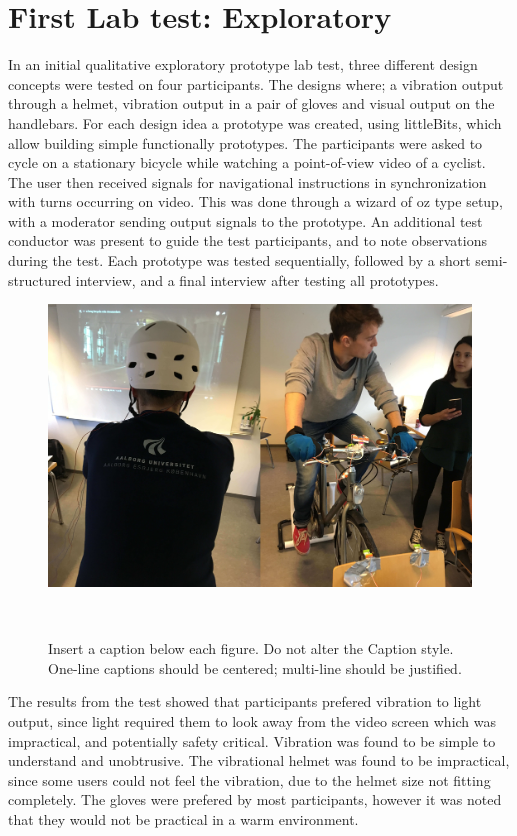 \documentclass{sigchi}
\begin{document}
\section{First Lab test: Exploratory}
In an initial qualitative exploratory prototype lab test, three different design concepts were tested on four participants. The designs where; a vibration output through a helmet, vibration output in a pair of gloves and visual output on the handlebars. 
For each design idea a prototype was created, using littleBits, which allow building simple functionally prototypes. The participants were asked to cycle on a stationary bicycle while watching a point-of-view video of a cyclist. The user then received signals for navigational instructions in synchronization with turns occurring on video. This was done through a wizard of oz type setup, with a moderator sending output signals to the prototype. An additional test conductor was present to guide the test participants, and to note observations during the test. Each prototype was tested sequentially, followed by a short semi-structured interview, and a final interview after testing all prototypes.
\begin{figure}
\centering
  \includegraphics[width=0.9\columnwidth]{figures/eval1_setup.jpg}
  \caption{Insert a caption below each figure. Do not alter the
    Caption style.  One-line captions should be centered; multi-line
    should be justified. }~\label{fig:figure1}
\end{figure}
The results from the test showed that participants prefered vibration to light output, since light required them to look away from the video screen which was impractical, and potentially safety critical. Vibration was found to be simple to understand and unobtrusive. The vibrational helmet was found to be impractical, since some users could not feel the vibration, due to the helmet size not fitting completely. The gloves were prefered by most participants, however it was noted that they would not be practical in a warm environment.
\end{document}
